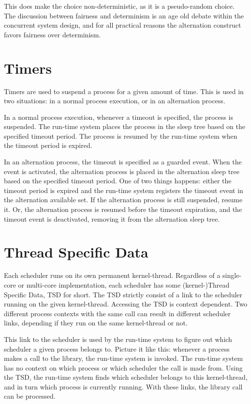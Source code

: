 This does make the choice non\hyp{}deterministic, as it is a pseudo\hyp{}random choice. The discussion between fairness and determinism is an age old debate within the concurrent system design, and for all practical reasons the alternation construct favors fairness over determinism. 


\section{Timers}

Timers are used to suspend a process for a given amount of time. This is used in two situations: in a normal process execution, or in an alternation process. 

In a normal process execution, whenever a timeout is specified, the process is suspended. The run\hyp{}time system places the process in the sleep tree based on the specified timeout period. The process is resumed by the run\hyp{}time system when the timeout period is expired.

In an alternation process, the timeout is specified as a guarded event. When the event is activated, the alternation process is placed in the alternation sleep tree based on the specified timeout period. One of two things happens: either the timeout period is expired and the run\hyp{}time system registers the timeout event in the alternation available set. If the alternation process is still suspended, resume it. Or, the alternation process is resumed before the timeout expiration, and the timeout event is deactivated, removing it from the alternation sleep tree. 


\section{Thread Specific Data}
\label{sec:thread_specific_data}

Each scheduler runs on its own permanent kernel\hyp{}thread. Regardless of a single\hyp{}core or multi\hyp{}core implementation, each scheduler has some (kernel\hyp{})Thread Specific Data, TSD for short. The TSD strictly consist of a link to the scheduler running on the given kernel\hyp{}thread. Accessing the TSD is context dependent. Two different process contexts with the same call can result in different scheduler links, depending if they run on the same kernel\hyp{}thread or not. 

This link to the scheduler is used by the run\hyp{}time system to figure out which scheduler a given process belongs to. Picture it like this: whenever a process makes a call to the library, the run\hyp{}time system is invoked. The run\hyp{}time system has no context on which process or which scheduler the call is made from. Using the TSD, the run\hyp{}time system finds which scheduler belongs to this kernel\hyp{}thread, and in turn which process is currently running. With these links, the library call can be processed. 


